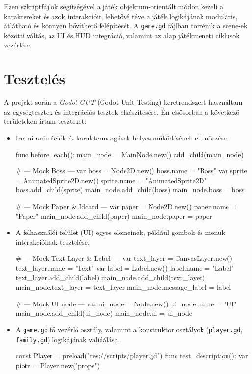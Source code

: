 \documentclass[12pt,a4paper]{article}
\begin{document}
Ezen szkriptfájlok segítségével a játék objektum-orientált módon kezeli a karaktereket és azok interakcióit, lehetővé téve a játék logikájának moduláris, átlátható és könnyen bővíthető felépítését. A \texttt{game.gd} fájlban történik a scene-ek közötti váltás, az UI és HUD integráció, valamint az alap játékmeneti ciklusok vezérlése.

\section{Tesztelés}

A projekt során a \emph{Godot GUT} (Godot Unit Testing) \cite{godot_gut} keretrendszert használtam az egységtesztek és integrációs tesztek elkészítésére. Én elsősorban a következő területeken írtam teszteket:

\begin{itemize}
    \item Irodai animációk és karaktermozgások helyes működésének ellenőrzése.
    \begin{python}
    func before_each():
	main_node = MainNode.new()
	add_child(main_node)

	# --- Mock Boss ---
	var boss = Node2D.new()
	boss.name = "Boss"
	var sprite = AnimatedSprite2D.new()
	sprite.name = "AnimatedSprite2D"
	boss.add_child(sprite)
	main_node.add_child(boss)
	main_node.boss = boss

	# --- Mock Paper & Idcard ---
	var paper = Node2D.new()
	paper.name = "Paper"
	main_node.add_child(paper)
	main_node.paper = paper
    \end{python}
    \item A felhasználói felület (UI) egyes elemeinek, például gombok és menük interakcióinak tesztelése.
    \begin{python}
    # --- Mock Text Layer & Label ---
	var text_layer = CanvasLayer.new()
	text_layer.name = "Text"
	var label = Label.new()
	label.name = "Label"
	text_layer.add_child(label)
	main_node.add_child(text_layer)
	main_node.text_layer = text_layer
	main_node.message_label = label

	# --- Mock UI node ---
	var ui_node = Node.new()
	ui_node.name = "UI"
	main_node.add_child(ui_node)
	main_node.ui = ui_node
    \end{python}
    \item A \texttt{game.gd} fő vezérlő osztály, valamint a konstruktor osztályok (\texttt{player.gd}, \texttt{family.gd}) logikájának validálása.
    \begin{python}
    const Player = preload("res://scripts/player.gd")
    func test_description():
    	var piotr = Player.new("props")
    	

\end{python}
\end{itemize}
\end{document}
